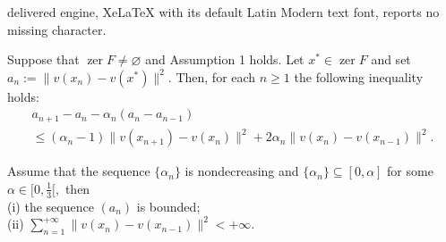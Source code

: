 \documentclass[10pt,a4paper]{amsart}
\newcommand{\zer}{\ensuremath{\operatorname{zer}}}
\begin{document}
delivered engine, XeLaTeX with its default Latin Modern text font, reports no missing character.
\begin{lemma}\label{lem5}
	 {Suppose that $\zer F\neq \varnothing$ and Assumption 1 holds. Let  $x^*\in \zer F$ and set $a_n:=\|v(x_n)-v(x^*)\|^2$.} Then, for each $n\geq 1$ the following inequality holds:
	\begin{equation}\label{estim1}
	\begin{array}{l}
	a_{n+1}-a_n-{\alpha_n }(a_n-a_{n-1})\\
	\leq(\alpha_n-1)\|v(x_{n+1})-v(x_{n})\|^2 +2\alpha_n\|v(x_{n})-v(x_{n-1})\|^2.
	\end{array}
	\end{equation}
\end{lemma}

\begin{corollary}\label{coro-disc}
	 Assume that the sequence $\{\alpha_n\}$ is nondecreasing and $\{\alpha_n\} \subseteq [0,\alpha]$ for some $\alpha\in [0,\frac{1}{3}[,$ then  \\
	 
	{ (i) the sequence $(a_n)$ is bounded};\\
	 
	 (ii) $\displaystyle \sum_{n=1}^{+\infty}\|v(x_n)-v(x_{n-1})\|^2<+\infty.$
\end{corollary}
\end{document}

